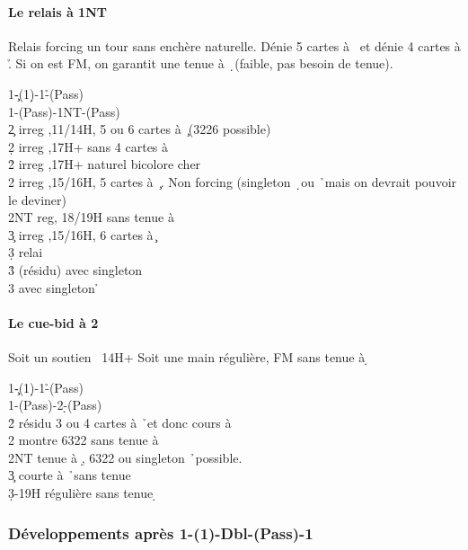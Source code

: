 \documentclass[a4paper]{article}
\begin{document}
\paragraph{Le relais à 1NT}

Relais forcing un tour sans enchère naturelle. Dénie 5 cartes à \s\ et dénie 4 cartes à \h . 
Si on est FM, on garantit une tenue à \d\ (faible, pas besoin de tenue).

\begin{bidtable}
1\c-(1\d)-1\h-(Pass)\\
1\s-(Pass)-1NT-(Pass)\\
2\c \> irreg ,11/14H, 5 ou 6 cartes à \c\ (3226 possible)\\
2\d \> irreg ,17H+ sans 4 cartes à \h \\
2\h \> irreg ,17H+ naturel bicolore cher\\
2\s \> irreg ,15/16H, 5 cartes à \c\ . Non forcing (singleton \d\ ou \h\ mais on devrait pouvoir le deviner)\\
2NT \> reg, 18/19H sans tenue à \d \\
3\c \> irreg ,15/16H, 6 cartes à \c \+\\
3\d \> relai\+\\
3\h \> (résidu) avec singleton \d \\
3\s \> avec singleton \h \-\-
\end{bidtable}

\paragraph{Le cue-bid à 2 \pdfd}

Soit un soutien \s\ 14H+
Soit une main régulière, FM sans tenue à \d 

\begin{bidtable}
1\c-(1\d)-1\h-(Pass)\\
1\s-(Pass)-2\d-(Pass)\\
2\h \> résidu 3 ou 4 cartes à \h\ et donc cours à \d \\
2\s \> montre 6322 sans tenue à \d \\
2NT \> tenue à \d , 6322 ou singleton \h\ possible.\\
3\c \> courte à \h\ sans tenue \d \\
3\d {}-19H régulière sans tenue \d 
\end{bidtable}

\subsubsection{Développements après 1\pdfc-(1\pdfh)-Dbl-(Pass)-1\pdfs}
\end{document}
